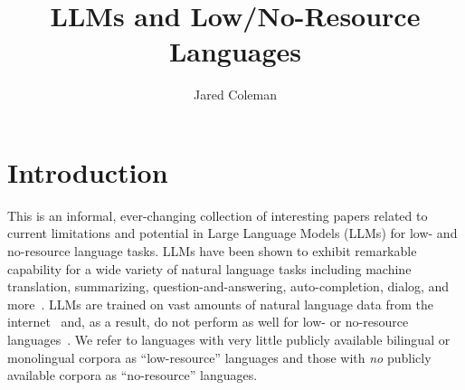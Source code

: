 \documentclass{article}
\title{LLMs and Low/No-Resource Languages}
\author{Jared Coleman}
\date{}
\begin{document}
\maketitle



\section*{Introduction}
This is an informal, ever-changing collection of interesting papers related to current limitations and potential in Large Language Models (LLMs) for low- and no-resource language tasks.
LLMs have been shown to exhibit remarkable capability for a wide variety of natural language tasks including machine translation, summarizing, question-and-answering, auto-completion, dialog, and more~\cite{gpt:agi}.
LLMs are trained on vast amounts of natural language data from the internet~\cite{gpt:gpt4-tech-report} and, as a result, do not perform as well for low- or no-resource languages~\cite{palm,gpt:low-resource-translation}.
We refer to languages with very little publicly available bilingual or monolingual corpora as ``low-resource'' languages and those with \textit{no} publicly available corpora as ``no-resource'' languages.
\end{document}
